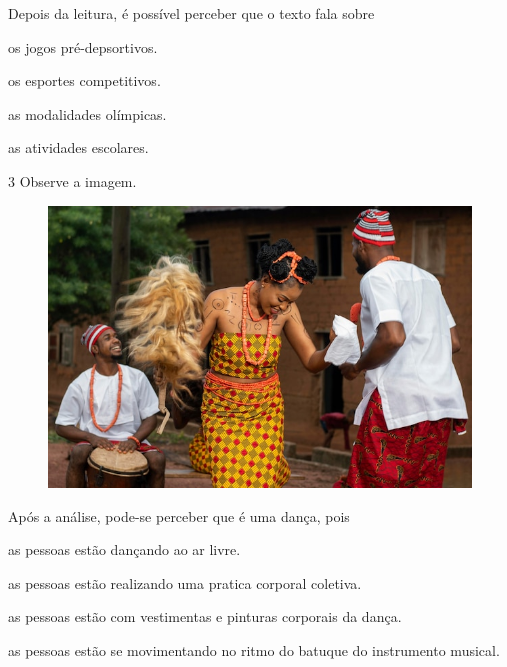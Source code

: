 \noindent{}Depois da leitura, é possível perceber que o texto fala sobre

\begin{escolha}
\item os jogos pré-depsortivos.

\item os esportes competitivos.

\item as modalidades olímpicas.

\item as atividades escolares.
\end{escolha}


\num{3} Observe a imagem.
  \begin{figure}[htpb!]
\includegraphics[width=\textwidth]{./imgs/img15.jpg}
\end{figure}

\noindent{}Após a análise, pode-se perceber que é uma dança, pois

\begin{escolha}
\item as pessoas estão dançando ao ar livre.

\item as pessoas estão realizando uma pratica corporal coletiva.

\item as pessoas estão com vestimentas e pinturas corporais da dança.

\item as pessoas estão se movimentando no ritmo do batuque do instrumento
musical.
\end{escolha}

